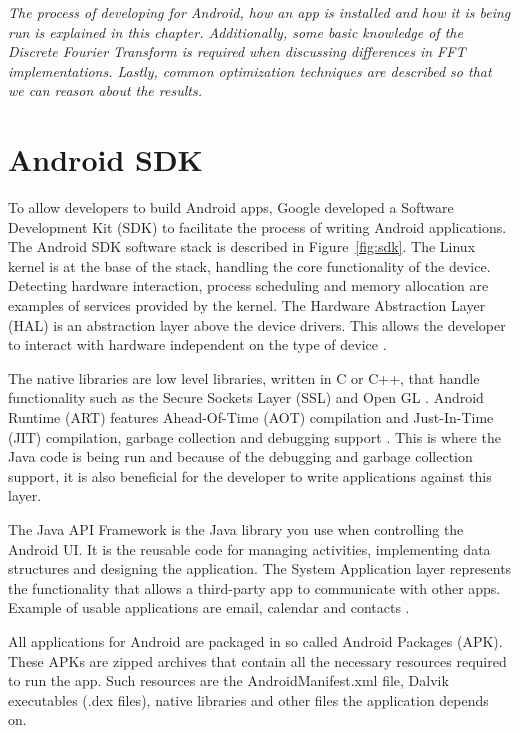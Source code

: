 \textit{The process of developing for Android, how an app is installed and how it is being run is explained in this chapter. Additionally, some basic knowledge of the Discrete Fourier Transform is required when discussing differences in FFT implementations. Lastly, common optimization techniques are described so that we can reason about the results.}

\section{Android SDK}
To allow developers to build Android apps, Google developed a Software Development Kit (SDK) to facilitate the process of writing Android applications. The Android SDK software stack is described in Figure~\ref{fig:sdk}. The Linux kernel is at the base of the stack, handling the core functionality of the device. Detecting hardware interaction, process scheduling and memory allocation are examples of services provided by the kernel. The Hardware Abstraction Layer (HAL) is an abstraction layer above the device drivers. This allows the developer to interact with hardware independent on the type of device \cite{android:hal}.

The native libraries are low level libraries, written in C or C++, that handle functionality such as the Secure Sockets Layer (SSL) and Open GL \cite{komatineni2012pro}. Android Runtime (ART) features Ahead-Of-Time (AOT) compilation and Just-In-Time (JIT) compilation, garbage collection and debugging support \cite{android:sdk:stack}. This is where the Java code is being run and because of the debugging and garbage collection support, it is also beneficial for the developer to write applications against this layer.

The Java API Framework is the Java library you use when controlling the Android UI. It is the reusable code for managing activities, implementing data structures and designing the application. The System Application layer represents the functionality that allows a third-party app to communicate with other apps. Example of usable applications are email, calendar and contacts \cite{android:sdk:stack}.

All applications for Android are packaged in so called Android Packages (APK). These APKs are zipped archives that contain all the necessary resources required to run the app. Such resources are the AndroidManifest.xml file, Dalvik executables (.dex files), native libraries and other files the application depends on.

